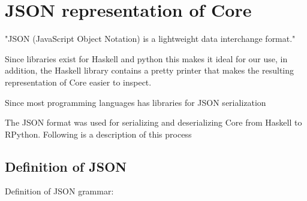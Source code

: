 
\section{JSON representation of Core}

"JSON (JavaScript Object Notation) is a lightweight data interchange format."

Since libraries exist for Haskell and python this makes it ideal for our use,
in addition, the Haskell library contains a pretty printer that makes the resulting
representation of Core easier to inspect.

Since most programming languages has libraries for JSON serialization

The JSON format was used for serializing and deserializing Core from Haskell to RPython.
Following is a description of this process


\subsection{Definition of JSON}

Definition of JSON grammar:

